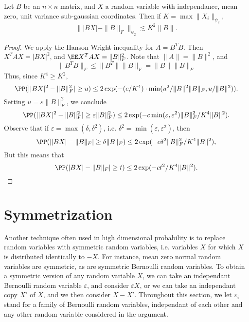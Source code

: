 \begin{theorem}
    Let $B$ be an $n \times n$ matrix, and $X$ a random variable with independance, mean zero, unit variance sub-gaussian coordinates. Then if $K = \max \| X_i \|_{\psi_2}$,
    \[ \| |BX| - \| B \|_F \|_{\psi_2} \lesssim K^2 \| B \|. \]
\end{theorem}
\begin{proof}
    We apply the Hanson-Wright inequality for $A = B^TB$. Then $X^TAX = |BX|^2$, and $\EE X^TAX = \| B \|_F^2$. Note that $\| A \| = \| B \|^2$, and
    \[ \| B^T B \|_F \leq \| B^T \| \| B \|_F = \| B \| \| B \|_F \]
    Thus, since $K^4 \geq K^2$,
    \[ \PP(| |BX|^2 - \| B \|_F^2 | \geq u) \leq 2 \exp(- (c/K^4) \cdot \min(u^2/\| B \|^2 \| B \|_F, u / \| B \|^2)). \]
    Setting $u = \varepsilon \| B \|_F^2$, we conclude
    \[ \PP(| |BX|^2 - \| B \|_F^2 | \geq \varepsilon \| B \|_F^2) \leq 2 \exp(-c \min(\varepsilon,\varepsilon^2) \| B \|_F^2 / K^4 \| B \|^2). \]
    Observe that if $\varepsilon = \max(\delta, \delta^2)$, i.e. $\delta^2 = \min(\varepsilon, \varepsilon^2)$, then
    \[ \PP(||BX| - \| B \|_F| \geq \delta \| B \|_F) \leq 2 \exp(-c\delta^2 \| B \|_F^2 / K^4 \| B \|^2), \]
    But this means that
    \[ \PP(|BX| - \| B \|_F| \geq t) \leq 2 \exp(-c t^2 / K^4 \| B \|^2). \qedhere \]
\end{proof}






\section{Symmetrization}

Another technique often used in high dimensional probability is to replace random variables with symmetric random variables, i.e. variables $X$ for which $X$ is distributed identically to $-X$. For instance, mean zero normal random variables are symmetric, as are symmetric Bernoulli random variables. To obtain a symmetric version of any random variable $X$, we can take an independant Bernoulli random variable $\varepsilon$, and consider $\varepsilon X$, or we can take an independant copy $X'$ of $X$, and we then consider $X - X'$. Throughout this section, we let $\varepsilon_i$ stand for a family of Bernoulli random variables, independant of each other and any other random variable considered in the argument.

